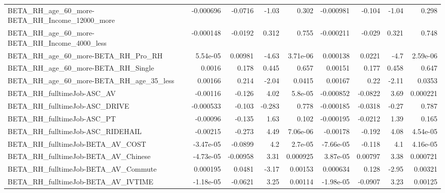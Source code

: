 \begin{tabular}{lrrrrrrrr}
BETA\_RH\_age\_60\_more-BETA\_RH\_Income\_12000\_more      &   -0.000696 &      -0.0716 &     -1.03 &    0.302 &  -0.000981 &      -0.104 &        -1.04 &         0.298 \\
BETA\_RH\_age\_60\_more-BETA\_RH\_Income\_4000\_less       &   -0.000148 &      -0.0192 &     0.312 &    0.755 &  -0.000211 &      -0.029 &        0.321 &         0.748 \\
BETA\_RH\_age\_60\_more-BETA\_RH\_Pro\_RH                 &    5.54e-05 &      0.00981 &     -4.63 & 3.71e-06 &   0.000138 &      0.0221 &         -4.7 &      2.59e-06 \\
BETA\_RH\_age\_60\_more-BETA\_RH\_Single                 &      0.0016 &        0.178 &     0.445 &    0.657 &    0.00151 &       0.177 &        0.458 &         0.647 \\
BETA\_RH\_age\_60\_more-BETA\_RH\_age\_35\_less            &     0.00166 &        0.214 &     -2.04 &   0.0415 &    0.00167 &        0.22 &        -2.11 &        0.0353 \\
BETA\_RH\_fulltimeJob-ASC\_AV                         &    -0.00116 &       -0.126 &      4.02 &  5.8e-05 &  -0.000852 &     -0.0822 &         3.69 &      0.000221 \\
BETA\_RH\_fulltimeJob-ASC\_DRIVE                      &   -0.000533 &       -0.103 &    -0.283 &    0.778 &  -0.000185 &     -0.0318 &        -0.27 &         0.787 \\
BETA\_RH\_fulltimeJob-ASC\_PT                         &    -0.00096 &       -0.135 &      1.63 &    0.102 &  -0.000195 &     -0.0212 &         1.39 &         0.165 \\
BETA\_RH\_fulltimeJob-ASC\_RIDEHAIL                   &    -0.00215 &       -0.273 &      4.49 & 7.06e-06 &   -0.00178 &      -0.192 &         4.08 &      4.54e-05 \\
BETA\_RH\_fulltimeJob-BETA\_AV\_COST                   &   -3.47e-05 &      -0.0899 &       4.2 &  2.7e-05 &  -7.66e-05 &      -0.118 &          4.1 &      4.16e-05 \\
BETA\_RH\_fulltimeJob-BETA\_AV\_Chinese                &   -4.73e-05 &     -0.00958 &      3.31 & 0.000925 &   3.87e-05 &     0.00797 &         3.38 &      0.000721 \\
BETA\_RH\_fulltimeJob-BETA\_AV\_Commute                &    0.000195 &       0.0481 &     -3.17 &  0.00153 &   0.000634 &       0.128 &        -2.95 &       0.00321 \\
BETA\_RH\_fulltimeJob-BETA\_AV\_IVTIME                 &   -1.18e-05 &      -0.0621 &      3.25 &  0.00114 &  -1.98e-05 &     -0.0907 &         3.23 &       0.00125 \\

\end{tabular}
